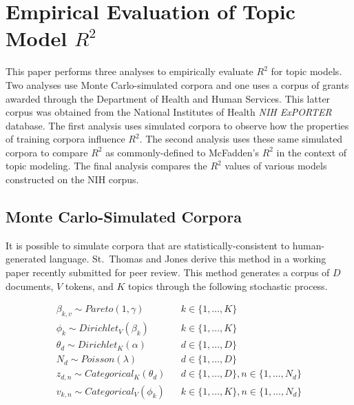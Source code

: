 \documentclass[conference,final,]{IEEEtran}
\begin{document}
\hypertarget{empirical-evaluation-of-topic-model-r2}{%
\section{\texorpdfstring{Empirical Evaluation of Topic Model
\(R^2\)}{Empirical Evaluation of Topic Model R\^{}2}}\label{empirical-evaluation-of-topic-model-r2}}

This paper performs three analyses to empirically evaluate \(R^2\) for
topic models. Two analyses use Monte Carlo-simulated corpora and one
uses a corpus of grants awarded through the Department of Health and
Human Services. This latter corpus was obtained from the National
Institutes of Health \emph{NIH ExPORTER} database. \cite{nih} The first
analysis uses simulated corpora to observe how the properties of
training corpora influence \(R^2\). The second analysis uses these same
simulated corpora to compare \(R^2\) as commonly-defined to McFadden's
\(R^2\) in the context of topic modeling. The final analysis compares
the \(R^2\) values of various models constructed on the NIH corpus.

\hypertarget{monte-carlo-simulated-corpora}{%
\subsection{Monte Carlo-Simulated
Corpora}\label{monte-carlo-simulated-corpora}}

It is possible to simulate corpora that are statistically-consistent to
human-generated language. St.~Thomas and Jones derive this method in a
working paper recently submitted for peer review. \cite{stthomas15} This
method generates a corpus of \(D\) documents, \(V\) tokens, and \(K\)
topics through the following stochastic process.

\begin{align}
    \beta_{k, v} \sim Pareto(1, \gamma) && k \in \{1, \ldots, K\} \\
    \phi_k \sim Dirichlet_V(\beta_k) && k \in \{1, \ldots, K\} \\
    \theta_d \sim Dirichlet_K(\alpha) && d \in \{1, \ldots, D\} \\
    N_d \sim Poisson(\lambda) &&  d \in \{1, \ldots, D\} \\
    z_{d,n} \sim Categorical_K(\theta_d) && d \in \{1, \ldots, D\}, n \in \{1, \ldots, N_d \} \\
    v_{k,n} \sim Categorical_V(\phi_k) && k \in \{1, \ldots, K\},  n \in \{1, \ldots, N_d \} \\
\end{align}
\end{document}

